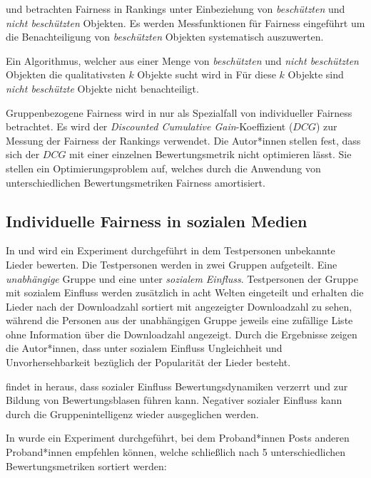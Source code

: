\cite{Singh20182219} und \cite{Yang2017} betrachten Fairness in Rankings unter Einbeziehung von \textit{beschützten} und \textit{nicht beschützten} Objekten. Es werden Messfunktionen für Fairness eingeführt um die Benachteiligung von \textit{beschützten} Objekten systematisch auszuwerten.

Ein Algorithmus, welcher aus einer Menge von \textit{beschützten} und \textit{nicht beschützten} Objekten die qualitativsten $k$ Objekte sucht wird in \cite{Zehlike20171569} Für diese $k$ Objekte sind \textit{nicht beschützte} Objekte nicht benachteiligt.

Gruppenbezogene Fairness wird in \cite{Biega2018405} nur als Spezialfall von individueller Fairness betrachtet. Es wird der \textit{Discounted Cumulative Gain}-Koeffizient ($DCG$) zur Messung der Fairness der Rankings verwendet. Die Autor*innen stellen fest, dass sich der $DCG$ mit einer einzelnen Bewertungsmetrik nicht optimieren lässt. Sie stellen ein Optimierungsproblem auf, welches durch die Anwendung von unterschiedlichen Bewertungsmetriken Fairness amortisiert.

\subsection{Individuelle Fairness in sozialen Medien}

In \cite{Salganik2006854} und \cite{Abeliuk} wird ein Experiment durchgeführt in dem Testpersonen unbekannte Lieder bewerten. Die Testpersonen werden in zwei Gruppen aufgeteilt. Eine \textit{unabhängige} Gruppe und eine unter \textit{sozialem Einfluss}. Testpersonen der Gruppe mit sozialem Einfluss werden zusätzlich in acht Welten eingeteilt und erhalten die Lieder nach der Downloadzahl sortiert mit angezeigter Downloadzahl zu sehen, während die Personen aus der unabhängigen Gruppe jeweils eine zufällige Liste ohne Information über die Downloadzahl angezeigt. Durch die Ergebnisse zeigen die Autor*innen, dass unter sozialem Einfluss Ungleichheit und Unvorhersehbarkeit bezüglich der Popularität der Lieder besteht.

\citeauthor{Muchnik2013647} findet in \cite{Muchnik2013647} heraus, dass sozialer Einfluss Bewertungsdynamiken verzerrt und zur Bildung von Bewertungsblasen führen kann.
Negativer sozialer Einfluss kann durch die Gruppenintelligenz wieder ausgeglichen werden.

In \cite{Lerman2014} wurde ein Experiment durchgeführt, bei dem Proband*innen Posts anderen Proband*innen empfehlen können, welche schließlich nach 5 unterschiedlichen Bewertungsmetriken sortiert werden: 

